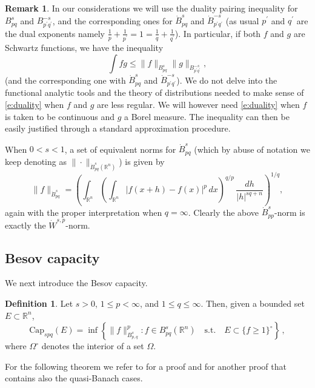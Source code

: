 \documentclass[11pt,reqno]{amsart}
\newcommand{\R}{\mathbb R}
\newcommand{\Capa}{\textrm{Cap}}
\theoremstyle{definition}
\newtheorem{definition}[theorem]{Definition}
\newtheorem{remark}[theorem]{Remark}
\numberwithin{equation}{section}
\begin{document}
\begin{remark}\label{r:duality}
In our considerations we will use the duality pairing inequality for $B^s_{pq}$ and 
$B^{-s}_{p^\prime q^\prime}$, and the corresponding ones for $\dot{B}^s_{pq}$ and $\dot{B}^{-s}_{p^\prime q^\prime}$ (as usual $p^\prime$ and $q^\prime$ are the dual exponents namely $\frac{1}{p}+\frac{1}{p^\prime}=1 = \frac{1}{q} +\frac{1}{q^\prime}$). In particular, if both $f$ and $g$ are Schwartz functions, we have the inequality
\begin{equation}\label{e:duality}
\int fg \leq \|f\|_{B^s_{pq}} \|g\|_{B^{-s}_{p^\prime q^\prime}}, 
\end{equation}
(and the corresponding one with $\dot{B}^s_{pq}$ and $\dot{B}^{-s}_{p^\prime q^\prime}$).
We do not delve into the functional analytic tools and the theory of distributions needed to make sense of \eqref{e:duality} when $f$ and $g$ are less regular. We will however need \eqref{e:duality} when $f$ is taken to be continuous and $g$ a Borel measure. The inequality can then be easily justified through a standard approximation procedure.
\end{remark}

When $0<s<1$, a set of equivalent norms for $\dot{B}^s_{pq}$ (which by abuse of notation we keep denoting as $\|\cdot\|_{\dot{B}^s_{pq} (\mathbb R^n)}$) is given by
\[
\|f\|_{\dot{B}^s_{pq}}=\left(\int_{\R^n}\left(\int_{\R^n}|f(x+h)-f(x)|^p\,dx\right)^{q/p}\,\frac{dh}{|h|^{sq+n}}\right)^{1/q},
\]
again with the proper interpretation when $q=\infty$.
Clearly the above  $\dot{B}^s_{pp}$-norm is exactly the $\dot{W}^{s,p}$-norm.

\subsection{Besov capacity} We next introduce the Besov capacity. 

\begin{definition} Let $s>0$, $1\le p <\infty$, and $1\leq q \leq \infty$. Then, given a bounded set $E\subset \mathbb R^n$, 
\begin{equation}\label{e:capacity}
\Capa_{spq} (E) =\inf \left\{ \|f\|^p_{B^s_{p,q}}: f\in B^s_{pq} (\mathbb R^n) \quad\mbox{s.t.} \quad E\subset\{f\ge1\}^\circ\right\}\, ,
\end{equation}
where $\Omega^\circ$ denotes the interior of a set $\Omega$. 
\end{definition}

For the following theorem we refer to \cite{Dor87} for a proof and \cite{Net89} for another proof that contains also the quasi-Banach cases. 
\end{document}
